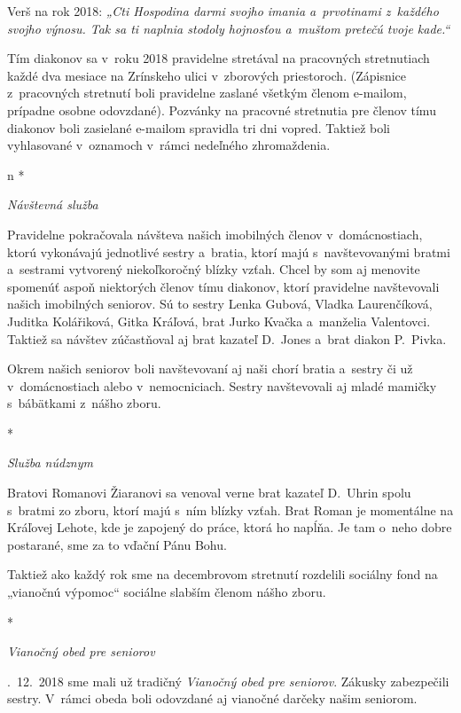 

Verš na rok 2018: {\it „Cti Hospodina darmi svojho imania a~prvotinami z~každého svojho výnosu. Tak sa ti naplnia stodoly hojnosťou a~muštom pretečú tvoje kade.“}



Tím diakonov sa v~roku 2018 pravidelne stretával na pracovných stretnutiach každé dva mesiace na Zrínskeho ulici v~zborových priestoroch. (Zápisnice z~pracovných stretnutí boli pravidelne zaslané všetkým členom e-mailom, prípadne osobne odovzdané). Pozvánky na pracovné stretnutia pre členov tímu diakonov boli zasielané e-mailom spravidla tri dni vopred. Taktiež boli vyhlasované v~oznamoch v~rámci nedeľného zhromaždenia.

\def\aktivita#1{{\it #1\par}\firstnoindent}

\begitems \style n
* \aktivita{Návštevná služba}
Pravidelne pokračovala návšteva našich imobilných členov v~domácnostiach, ktorú vykonávajú jednotlivé sestry a~bratia, ktorí majú s~navštevovanými bratmi a~sestrami vytvorený niekoľkoročný blízky vzťah. Chcel by som aj menovite spomenúť aspoň niektorých členov tímu diakonov, ktorí pravidelne navštevovali našich imobilných seniorov. Sú to sestry Lenka Gubová, Vladka Laurenčíková, Juditka Kolářiková, Gitka Kráľová, brat Jurko Kvačka a~manželia Valentovci. Taktiež sa návštev zúčastňoval aj brat kazateľ D.~Jones a~brat diakon P.~Pivka.

Okrem našich seniorov boli navštevovaní aj naši chorí bratia a~sestry či už v~domácnostiach alebo v~nemocniciach. Sestry navštevovali aj mladé mamičky s~bábätkami z~nášho zboru.

* \aktivita{Služba núdznym}
Bratovi Romanovi Žiaranovi sa venoval verne brat kazateľ D.~Uhrin spolu s~bratmi zo zboru, ktorí majú s~ním blízky vzťah. Brat Roman je momentálne na Kráľovej Lehote, kde je zapojený do práce, ktorá ho napĺňa. Je tam o~neho dobre postarané, sme za to vďační Pánu Bohu.

Taktiež ako každý rok sme na decembrovom stretnutí rozdelili sociálny fond na „vianočnú výpomoc“ sociálne slabším členom nášho zboru.

* \aktivita{Vianočný obed pre seniorov}
 2.~12.~2018 sme mali už tradičný {\it Vianočný obed pre seniorov}. Zákusky zabezpečili sestry. V~rámci obeda boli odovzdané aj vianočné darčeky našim seniorom.

